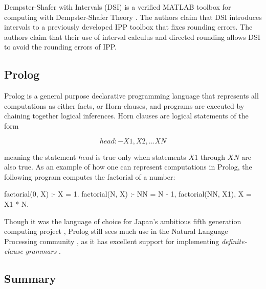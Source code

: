 \documentclass[thesis.tex]{subfiles}
\begin{document}
Dempster-Shafer with Intervals (DSI) is a verified MATLAB toolbox
for computing with Dempster-Shafer Theory \cite{auer2010verified}. The authors
claim that DSI introduces intervals to a previously developed IPP toolbox\cite{limbourg2007}
that fixes rounding errors. The authors claim that their use of interval calculus and
directed rounding allows DSI to avoid the rounding errors of IPP.

%
%

\subsection{Prolog}

Prolog is a general purpose declarative programming language that represents all computations
as either facts, or Horn-clauses, and programs are executed by chaining together logical inferences.
Horn clauses are logical statements of the form

$$
head :- X1, X2, ... XN
$$

meaning the statement $head$ is true only when statements $X1$ through $XN$ are also true.
As an example of how one can represent computations in Prolog, the following program computes
the factorial of a number:

\begin{code}
factorial(0, X) :- X = 1.
factorial(N, X) :- NN = N - 1, factorial(NN, X1), X = X1 * N.
\end{code}

Though it was the language of choice for Japan's ambitious fifth generation computing project \cite{shapiro1983fifth},
Prolog still sees much use in the Natural Language Processing community
\cite{covington1994natural, pelletier2006representation},
as it has excellent support for implementing \emph{definite-clause grammars} \cite{pereira1980definite}.

%
%



%
%



%
%




\subsection{Summary}
\end{document}
